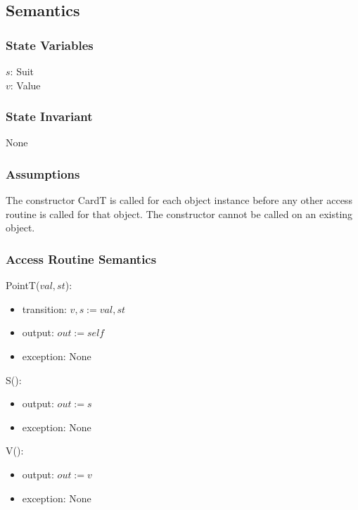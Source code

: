 \documentclass[12pt]{article}
\begin{document}
\subsection* {Semantics}

\subsubsection* {State Variables}

$s$: Suit\\
$v$: Value

\subsubsection* {State Invariant}

None

\subsubsection* {Assumptions}

The constructor CardT is called for each object instance before any other
access routine is called for that object.  The constructor cannot be called on
an existing object.

\subsubsection* {Access Routine Semantics}

PointT($val, st$):
\begin{itemize}
\item transition: $v, s := val, st$
\item output: $out := \mathit{self}$
\item exception: None
\end{itemize}

\noindent S():
\begin{itemize}
\item output: $out := s$
\item exception: None
\end{itemize}

\noindent V():
\begin{itemize}
\item output: $out := v$
\item exception: None
\end{itemize}
\end{document}
